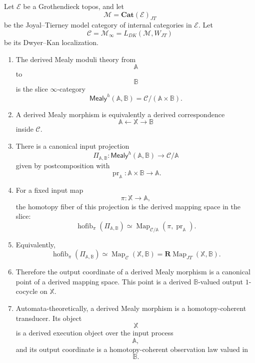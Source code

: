 \begin{theorem}
\label{thm:derived-mealy-main-consolidation-rewritten}
Let \(\mathcal E\) be a Grothendieck topos, and let
\[
\mathcal M=\mathbf{Cat}(\mathcal E)_{JT}
\]
be the Joyal--Tierney model category of internal categories in
\(\mathcal E\). Let
\[
\mathcal C
=
\mathcal M_\infty
=
L_{DK}(\mathcal M,W_{JT})
\]
be its Dwyer--Kan localization.

\begin{enumerate}
\item The derived Mealy moduli theory from
\[
\mathbb A
\]
to
\[
\mathbb B
\]
is the slice \(\infty\)-category
\[
\mathsf{Mealy}^h(\mathbb A,\mathbb B)
=
\mathcal C/(\mathbb A\times\mathbb B).
\]

\item A derived Mealy morphism is equivalently a derived correspondence
\[
\mathbb A
\longleftarrow
\mathbb X
\longrightarrow
\mathbb B
\]
inside \(\mathcal C\).

\item There is a canonical input projection
\[
\Pi_{\mathbb A,\mathbb B}:
\mathsf{Mealy}^h(\mathbb A,\mathbb B)
\longrightarrow
\mathcal C/\mathbb A
\]
given by postcomposition with
\[
\operatorname{pr}_{\mathbb A}:
\mathbb A\times\mathbb B\to\mathbb A.
\]

\item For a fixed input map
\[
\pi:\mathbb X\to\mathbb A,
\]
the homotopy fiber of this projection is the derived mapping space in
the slice:
\[
\operatorname{hofib}_{\pi}
\left(
\Pi_{\mathbb A,\mathbb B}
\right)
\simeq
\operatorname{Map}_{\mathcal C/\mathbb A}
\left(
\pi,\operatorname{pr}_{\mathbb A}
\right).
\]

\item Equivalently,
\[
\operatorname{hofib}_{\pi}
\left(
\Pi_{\mathbb A,\mathbb B}
\right)
\simeq
\operatorname{Map}_{\mathcal C}(\mathbb X,\mathbb B)
=
\mathbf R\!\operatorname{Map}_{JT}(\mathbb X,\mathbb B).
\]

\item Therefore the output coordinate of a derived Mealy morphism is a
canonical point of a derived mapping space. This point is a derived
\(\mathbb B\)-valued output \(1\)-cocycle on \(\mathbb X\).

\item Automata-theoretically, a derived Mealy morphism is a
homotopy-coherent transducer. Its object
\[
\mathbb X
\]
is a derived execution object over the input process
\[
\mathbb A,
\]
and its output coordinate is a homotopy-coherent observation law valued
in
\[
\mathbb B.
\]


\end{enumerate}
\end{theorem}
